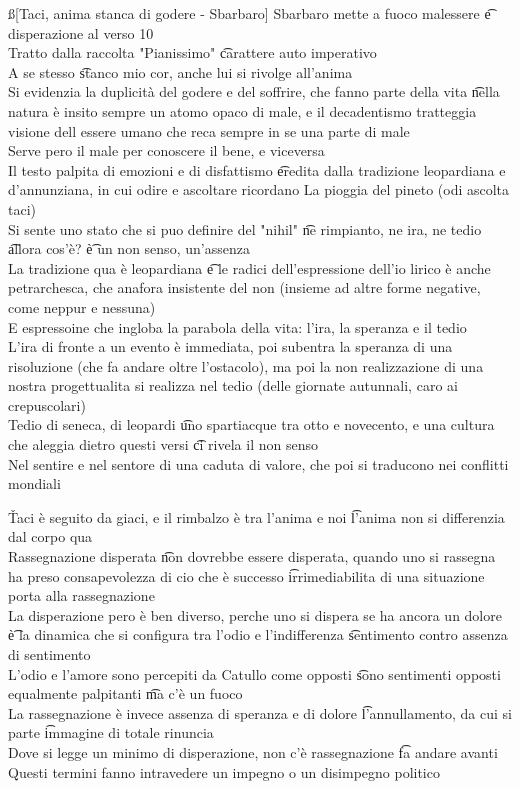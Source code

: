 \documentclass[12pt]{article}
\begin{document}
\ss[Taci, anima stanca di godere - Sbarbaro]
Sbarbaro mette a fuoco malessere \t e disperazione al verso 10 \\
Tratto dalla raccolta "Pianissimo" \t carattere auto imperativo \\
A se stesso \t stanco mio cor, anche lui si rivolge all'anima \\
Si evidenzia la duplicità del godere e del soffrire, che fanno parte della vita \t nella natura è insito sempre un atomo opaco di male, e il decadentismo tratteggia visione dell essere umano che reca sempre in se una parte di male \\
Serve pero il male per conoscere il bene, e viceversa \\
Il testo palpita di emozioni e di disfattismo \t eredita dalla tradizione leopardiana e d'annunziana, in cui odire e ascoltare ricordano La pioggia del pineto (odi ascolta taci) \\
Si sente uno stato che si puo definire del "nihil" \t ne rimpianto, ne ira, ne tedio \t allora cos'è? \t è un non senso, un'assenza \\
La tradizione qua è leopardiana \t e le radici dell'espressione dell'io lirico è anche petrarchesca, che anafora insistente del non (insieme ad altre forme negative, come neppur e nessuna) \\
E espressoine che ingloba la parabola della vita: l'ira, la speranza e il tedio \\
L'ira di fronte a un evento è immediata, poi subentra la speranza di una risoluzione (che fa andare oltre l'ostacolo), ma poi la non realizzazione di una nostra progettualita si realizza nel tedio (delle giornate autunnali, caro ai crepuscolari) \\
Tedio di seneca, di leopardi \t uno spartiacque tra otto e novecento, e una cultura che aleggia dietro questi versi \t ci rivela il non senso \\
Nel sentire e nel sentore di una caduta di valore, che poi si traducono nei conflitti mondiali

\v

Taci è seguito da giaci, e il rimbalzo è tra l'anima e noi \t l'anima non si differenzia dal corpo qua \\
Rassegnazione disperata \t non dovrebbe essere disperata, quando uno si rassegna ha preso consapevolezza di cio che è successo \t irrimediabilita di una situazione porta alla rassegnazione \\
La disperazione pero è ben diverso, perche uno si dispera se ha ancora un dolore \t è la dinamica che si configura tra l'odio e l'indifferenza \t sentimento contro assenza di sentimento \\
L'odio e l'amore sono percepiti da Catullo come opposti \t sono sentimenti opposti equalmente palpitanti \t ma c'è un fuoco \\
La rassegnazione è invece assenza di speranza e di dolore \t l'annullamento, da cui si parte \t immagine di totale rinuncia \\
Dove si legge un minimo di disperazione, non c'è rassegnazione \t fa andare avanti \\
Questi termini fanno intravedere un impegno o un disimpegno politico
\end{document}
